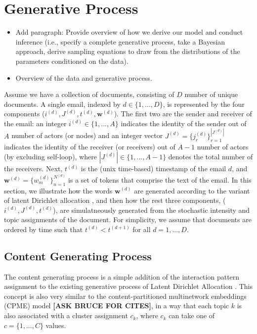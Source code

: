 \documentclass[a4paper]{article}
\begin{document}
\section{Generative Process} \label{sec: Generative Process}


\begin{itemize}
\item Add paragraph: Provide overview of how we derive our model and conduct inference (i.e., specify a complete generative process, take a Bayesian approach, derive sampling equations to draw from the distributions of the parameters conditioned on the data). 
\end{itemize}

\begin{itemize}
\item Overview of the data and generative process.
\end{itemize}

Assume we have a collection of documents, consisting of $D$ number of unique documents. A single email, indexed by $d \in \{1,...,D\}$, is represented by the four components ($i^{(d)}, J^{(d)}, t^{(d)},  \boldsymbol{w}^{(d)}$). The first two are the sender and receiver of the email: an integer $i^{(d)} \in \{1,...,A\}$ indicates the identity of the sender out of $A$ number of actors (or nodes) and an integer vector $J^{(d)} = \{j_r^{(d)}\}_{r=1}^{|J^{(d)}|} $ indicates the identity of the receiver (or receivers) out of $A-1$ number of actors (by excluding self-loop), where $|J^{(d)}|\in \{1,...,A-1\}$ denotes the total number of the receivers. Next, $t^{(d)}$ is the (unix time-based) timestamp of the email $d$, and $\boldsymbol{w}^{(d)} = \{w^{(d)}_m \}_{n=1}^{N^{(d)}}$ is a set of tokens that comprise the text of the email. In this section, we illustrate how the words $\boldsymbol{w}^{(d)}$ are generated according to the variant of latent Dirichlet allocation \citep{Blei2003}, and then how the rest three components, ($i^{(d)}, J^{(d)}, t^{(d)}$), are simulatneously generated from the stochastic intensity and topic assignments of the document. For simplicity, we assume that documents are ordered by time such that $t^{(d)} < t^{(d+1)}$ for all $d=1, ..., D$.
\subsection{Content Generating Process} \label{subsec: Content Generating Process}
The content generating process is a simple addition of the interaction pattern assignment to the existing generative process of Latent Dirichlet Allocation \cite{Blei2003}. This concept is also very similar to the content-partitioned multinetwork embeddings (CPME) model {\bf [ASK BRUCE FOR CITES]}, in a way that each topic $k$ is also associated with a cluster assignment $c_k$, where $c_k$ can take one of $c = \{1,...,C\}$ values. 
\end{document}
